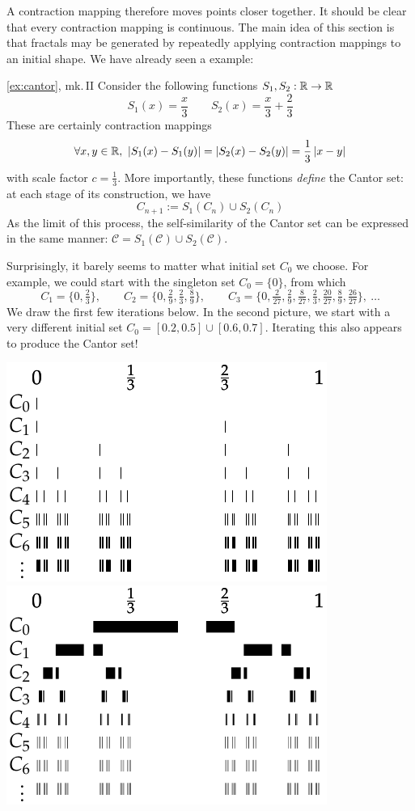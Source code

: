 A contraction mapping therefore moves points closer together. It should be clear that every contraction mapping is continuous. The main idea of this section is that fractals may be generated by repeatedly applying contraction mappings to an initial shape. We have already seen a example:


\begin{example*}{\ref{ex:cantor}, mk.\,II}{}
Consider the following functions $S_1,S_2:\mathbb{R}\to\mathbb{R}$
\[S_1(x)=\frac x3\qquad S_2(x)=\frac x3+\frac 23\]
These are certainly contraction mappings
\[\forall x,y\in\R,\ \nm{S_1(x)-S_1(y)}=\nm{S_2(x)-S_2(y)}=\frac 13\nm{x-y}\]
with scale factor $c=\frac 13$. More importantly, these functions \emph{define} the Cantor set: at each stage of its construction, we have
\[C_{n+1}:=S_1(C_n)\cup S_2(C_n)\]
As the limit of this process, the self-similarity of the Cantor set can be expressed in the same manner: $\mathcal C=S_1(\mathcal C)\cup S_2(\mathcal C)$.\medbreak

Surprisingly, it barely seems to matter what initial set $C_0$ we choose. For example, we could start with the singleton set $C_0=\{0\}$, from which
\[C_1=\{0,\tfrac 23\},\qquad C_2=\{0,\tfrac 29,\tfrac 23,\tfrac 89\},\qquad C_3=\{0,\tfrac 2{27},\tfrac 29,\tfrac 8{27},\tfrac 23,\tfrac{20}{27},\tfrac 89,\tfrac{26}{27}\},\ \ldots\]
We draw the first few iterations below. In the second picture, we start with a very different initial set $C_0=[0.2,0.5]\cup[0.6,0.7]$. Iterating this also appears to produce the Cantor set!
\begin{center}
\includegraphics{cantor-similar3}
\qquad\qquad
\includegraphics{cantor-similar2}
\end{center}
\end{example*}

